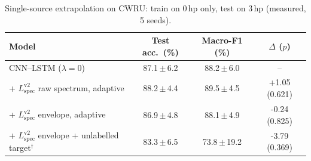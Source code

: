 \begin{table}[t]
\caption{Single-source extrapolation on CWRU: train on 0\,hp only, test on 3\,hp (measured, 5 seeds).}
\label{tab:single}
\centering
\footnotesize
\begin{tabular}{lccc}
\toprule
Model & Test acc.\ (\%) & Macro-F1 (\%) & $\Delta$ ($p$) \\
\midrule
CNN--LSTM ($\lambda=0$) & 87.1\,$\pm$\,6.2 & 88.2\,$\pm$\,6.0 & -- \\
+ $L_{\mathrm{spec}}^{\mathrm{v2}}$ raw spectrum, adaptive & 88.2\,$\pm$\,4.4 & 89.5\,$\pm$\,4.5 & +1.05 (0.621) \\
+ $L_{\mathrm{spec}}^{\mathrm{v2}}$ envelope, adaptive & 86.9\,$\pm$\,4.8 & 88.1\,$\pm$\,4.9 & -0.24 (0.825) \\
+ $L_{\mathrm{spec}}^{\mathrm{v2}}$ envelope + unlabelled target$^{\dagger}$ & 83.3\,$\pm$\,6.5 & 73.8\,$\pm$\,19.2 & -3.79 (0.369) \\
\bottomrule
\end{tabular}
\end{table}
